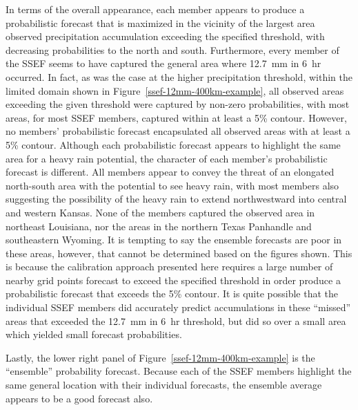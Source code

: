 In terms of the overall appearance, each member appears to produce a probabilistic forecast that is maximized in the vicinity of the largest area observed precipitation accumulation exceeding the specified threshold, with decreasing probabilities to the north and south.
Furthermore, every member of the SSEF seems to have captured the general area where \mbox{12.7 mm} in \mbox{6 hr} occurred.
In fact, as was the case at the higher precipitation threshold, within the limited domain shown in \mbox{Figure \ref{ssef-12mm-400km-example}}, all observed areas exceeding the given threshold were captured by non-zero probabilities, with most areas, for most SSEF members, captured within at least a 5\% contour.
However, no members' probabilistic forecast encapsulated all observed areas with at least a 5\% contour.
Although each probabilistic forecast appears to highlight the same area for a heavy rain potential, the character of each member's probabilistic forecast is different.
All members appear to convey the threat of an elongated north-south area with the potential to see heavy rain, with most members also suggesting the possibility of the heavy rain to extend northwestward into central and western Kansas.
None of the members captured the observed area in northeast Louisiana, nor the areas in the northern Texas Panhandle and southeastern Wyoming.
It is tempting to say the ensemble forecasts are poor in these areas, however, that cannot be determined based on the figures shown.
This is because the calibration approach presented here requires a large number of nearby grid points forecast to exceed the specified threshold in order produce a probabilistic forecast that exceeds the 5\% contour.
It is quite possible that the individual SSEF members did accurately predict accumulations in these ``missed'' areas that exceeded the \mbox{12.7 mm} in \mbox{6 hr} threshold, but did so over a small area which yielded small forecast probabilities.


Lastly, the lower right panel of \mbox{Figure \ref{ssef-12mm-400km-example}} is the ``ensemble'' probability forecast.
Because each of the SSEF members highlight the same general location with their individual forecasts, the ensemble average appears to be a good forecast also.



